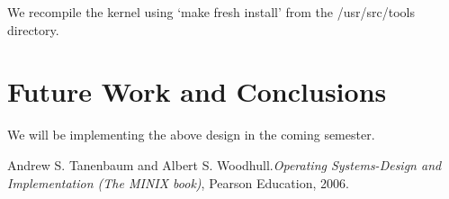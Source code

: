 \documentclass[a4paper,11pt,twocolumn]{article}
\begin{document}
We recompile the kernel using ‘make fresh install’ from the /usr/src/tools directory.

\section{Future Work and Conclusions}
We will be implementing the above design in the coming semester.
\begin{thebibliography}{}
Andrew S. Tanenbaum and Albert S. Woodhull.\textit{Operating Systems-Design and Implementation (The MINIX book)}, Pearson Education, 2006.
\end{thebibliography}{}
\end{document}
